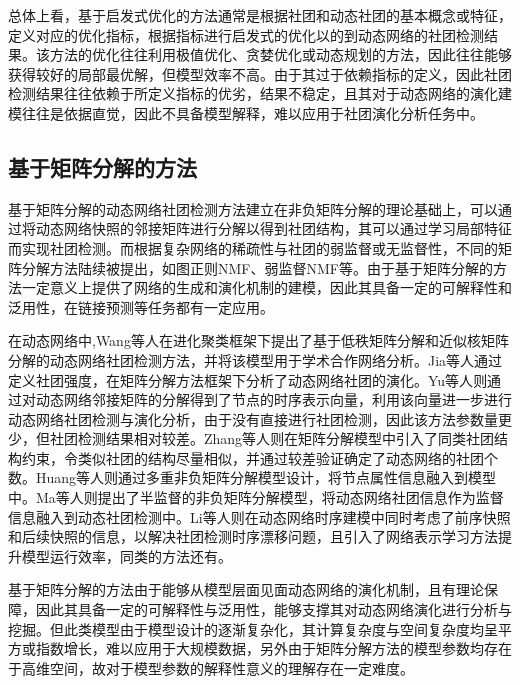 总体上看，基于启发式优化的方法通常是根据社团和动态社团的基本概念或特征，定义对应的优化指标，根据指标进行启发式的优化以的到动态网络的社团检测结果。该方法的优化往往利用极值优化、贪婪优化或动态规划的方法，因此往往能够获得较好的局部最优解，但模型效率不高。由于其过于依赖指标的定义，因此社团检测结果往往依赖于所定义指标的优劣，结果不稳定，且其对于动态网络的演化建模往往是依据直觉，因此不具备模型解释，难以应用于社团演化分析任务中。



\subsection{基于矩阵分解的方法}
基于矩阵分解的动态网络社团检测方法建立在非负矩阵分解的理论基础上，可以通过将动态网络快照的邻接矩阵进行分解以得到社团结构，其可以通过学习局部特征而实现社团检测\cite{lee1999learning}。而根据复杂网络的稀疏性与社团的弱监督或无监督性，不同的矩阵分解方法陆续被提出，如图正则NMF\cite{cai2010graph}、弱监督NMF\cite{choo2015weakly}等。由于基于矩阵分解的方法一定意义上提供了网络的生成和演化机制的建模，因此其具备一定的可解释性和泛用性，在链接预测\cite{ma2017nonnegative}等任务都有一定应用。

在动态网络中,Wang等人\cite{wang2010low}在进化聚类框架下提出了基于低秩矩阵分解和近似核矩阵分解的动态网络社团检测方法，并将该模型用于学术合作网络分析。Jia等人\cite{jia2014analysis}通过定义社团强度，在矩阵分解方法框架下分析了动态网络社团的演化。Yu等人\cite{yu2017temporally}则通过对动态网络邻接矩阵的分解得到了节点的时序表示向量，利用该向量进一步进行动态网络社团检测与演化分析，由于没有直接进行社团检测，因此该方法参数量更少，但社团检测结果相对较差。Zhang等人\cite{zhang2012common}则在矩阵分解模型中引入了同类社团结构约束，令类似社团的结构尽量相似，并通过较差验证确定了动态网络的社团个数。Huang等人\cite{huang2016clustering}则通过多重非负矩阵分解模型设计，将节点属性信息融入到模型中。Ma等人\cite{ma2017evolutionary}则提出了半监督的非负矩阵分解模型，将动态网络社团信息作为监督信息融入到动态社团检测中。Li等人\cite{li2021detecting}则在动态网络时序建模中同时考虑了前序快照和后续快照的信息，以解决社团检测时序漂移问题，且引入了网络表示学习方法提升模型运行效率，同类的方法还有\cite{li2021identification}。

基于矩阵分解的方法由于能够从模型层面见面动态网络的演化机制，且有理论保障，因此其具备一定的可解释性与泛用性，能够支撑其对动态网络演化进行分析与挖掘。但此类模型由于模型设计的逐渐复杂化，其计算复杂度与空间复杂度均呈平方或指数增长，难以应用于大规模数据，另外由于矩阵分解方法的模型参数均存在于高维空间，故对于模型参数的解释性意义的理解存在一定难度。

